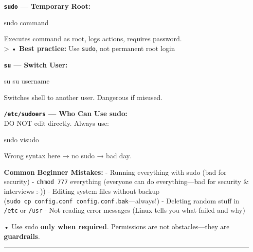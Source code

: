 \documentclass[
  english,
  paper=a4,
  oneside  ,captions=tableheading
]{scrartcl}
\newenvironment{Shaded}{}{}
\newcommand{\FunctionTok}[1]{\textcolor[rgb]{0.02,0.16,0.49}{#1}}
\newcommand{\NormalTok}[1]{#1}
\renewenvironment{quote}{\begin{customblockquote}\list{}{\rightmargin=0em\leftmargin=0em}%
\item\relax\color{blockquote-text}\ignorespaces}{\unskip\unskip\endlist\end{customblockquote}}
\begin{document}
\textbf{\texttt{sudo} --- Temporary Root:}

\begin{Shaded}
\begin{Highlighting}[]
\FunctionTok{sudo}\NormalTok{ command}
\end{Highlighting}
\end{Shaded}

Executes command as root, logs actions, requires password.\\
\textgreater{} • \textbf{Best practice:} Use \texttt{sudo}, not
permanent root login

\textbf{\texttt{su} --- Switch User:}

\begin{Shaded}
\begin{Highlighting}[]
\FunctionTok{su}
\FunctionTok{su}\NormalTok{ username}
\end{Highlighting}
\end{Shaded}

Switches shell to another user. \faExclamationCircle Dangerous if
misused.

\textbf{\texttt{/etc/sudoers} --- Who Can Use sudo:}\\
DO NOT edit directly. Always use:

\begin{Shaded}
\begin{Highlighting}[]
\FunctionTok{sudo}\NormalTok{ visudo}
\end{Highlighting}
\end{Shaded}

Wrong syntax here → no sudo → bad day.

\textbf{Common Beginner Mistakes:} - \faTimesCircle Running everything
with sudo (bad for security) - \faTimesCircle \texttt{chmod\ 777}
everything (everyone can do everything---bad for security \& interviews
:-)) - \faTimesCircle Editing system files without backup
(\texttt{sudo\ cp\ config.conf\ config.conf.bak}---always!) -
\faTimesCircle Deleting random stuff in \texttt{/etc} or \texttt{/usr} -
\faTimesCircle Not reading error messages (Linux tells you what failed
and why)

\begin{quote}
• Use sudo \textbf{only when required}. Permissions are not
obstacles---they are \textbf{guardrails}.
\end{quote}

\begin{center}\rule{0.5\linewidth}{0.5pt}\end{center}
\end{document}
